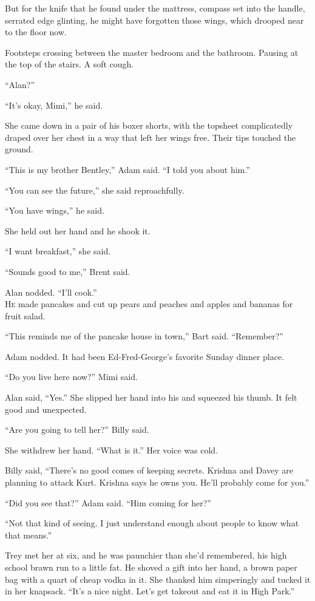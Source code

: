 \documentclass{article}
\begin{document}
But for the knife that he found under the mattress, compass set into
the handle, serrated edge glinting, he might have forgotten those
wings, which drooped near to the floor now. 

Footsteps crossing between the master bedroom and the bathroom. 
Pausing at the top of the stairs.  A soft cough.

``Alan?''

``It's okay, Mimi,'' he said. 

She came down in a pair of his boxer shorts, with the topsheet
complicatedly draped over her chest in a way that left her wings free. 
Their tips touched the ground.

``This is my brother Bentley,'' Adam said.  ``I told you about him.''

``You can see the future,'' she said reproachfully.

``You have wings,'' he said.

She held out her hand and he shook it.

``I want breakfast,'' she said. 

``Sounds good to me,'' Brent said. 

Alan nodded.  ``I'll cook.''
\\
\lettrine[lines=3, lhang=.5, nindent=0pt, findent=2pt]{H}{e} made pancakes and cut up pears and peaches and apples and bananas
for fruit salad. 

``This reminds me of the pancake house in town,'' Bart said. 
``Remember?''

Adam nodded.  It had been Ed-Fred-George's favorite Sunday dinner
place.

``Do you live here now?'' Mimi said.

Alan said, ``Yes.'' She slipped her hand into his and squeezed his
thumb.  It felt good and unexpected.

``Are you going to tell her?'' Billy said. 

She withdrew her hand.  ``What is it.'' Her voice was cold.

Billy said, ``There's no good comes of keeping secrets.  Krishna and
Davey are planning to attack Kurt.  Krishna says he owns you.  He'll
probably come for you.''

``Did you see that?'' Adam said.  ``Him coming for her?''

``Not that kind of seeing.  I just understand enough about people to
know what that means.''

Trey met her at six, and he was paunchier than she'd remembered, his
high school brawn run to a little fat.  He shoved a gift into her
hand, a brown paper bag with a quart of cheap vodka in it.  She
thanked him simperingly and tucked it in her knapsack.  ``It's a nice
night.  Let's get takeout and eat it in High Park.''
\end{document}
